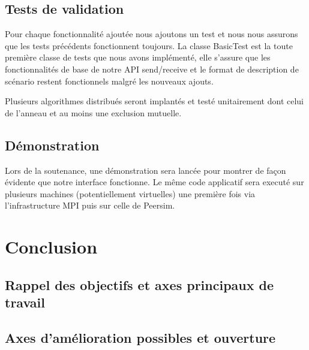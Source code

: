 \documentclass{article}
\begin{document}
		\subsection{Tests de validation}
		Pour chaque fonctionnalité ajoutée nous ajoutons un test et nous nous assurons que les tests précédents fonctionnent toujours.
		\newline
		La classe BasicTest est la toute première classe de tests que nous avons implémenté, elle s'assure que les fonctionnalités de base de notre API
		send/receive et le format de description de scénario restent fonctionnels malgré les nouveaux ajouts.

		Plusieurs algorithmes distribués seront implantés et testé unitairement dont celui de l'anneau et au moins une exclusion mutuelle.
		\subsection{Démonstration}
		Lors de la soutenance, une démonstration sera lancée pour montrer de façon évidente que notre interface fonctionne.
		Le même code applicatif sera executé sur plusieurs machines (potentiellement virtuelles) une première fois via l'infrastructure MPI puis sur celle de Peersim.
		
		\newpage
		\section{Conclusion}
		\subsection{Rappel des objectifs et axes principaux de travail}
		\subsection{Axes d'amélioration possibles et ouverture}
		
		
\end{document}
